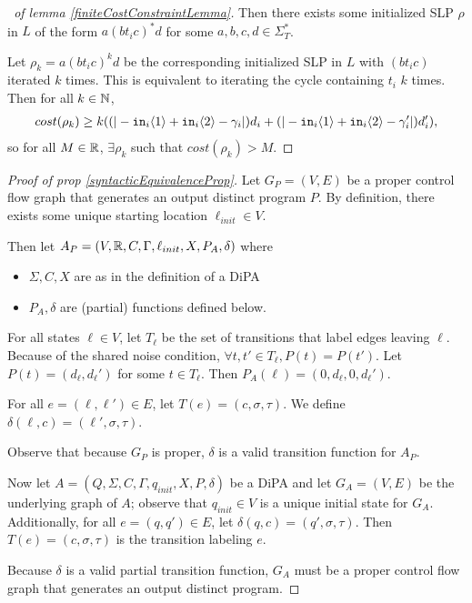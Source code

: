 \begin{proof}[\proofname~of lemma \ref{finiteCostConstraintLemma}]
    Then there exists some initialized SLP $\rho$ in $L$ of the form $a(bt_ic)^*d$ for some $a, b, c, d\in \Sigma_T^*$.
    
    Let $\rho_k=a(bt_ic)^kd$ be the corresponding initialized SLP in $L$ with $(bt_ic)$ iterated $k$ times. This is equivalent to iterating the cycle containing $t_i$ $k$ times. Then for all $k\in \mathbb{N}$, \begin{align*}
        cost(\rho_k) \geq k((|-\texttt{in}_i\langle1 \rangle+\texttt{in}_i\langle2 \rangle-\gamma_i|)d_i+(|-\texttt{in}_i\langle1 \rangle+\texttt{in}_i\langle2 \rangle-\gamma_i'|)d_i'),
    \end{align*}
    so for all $M\in \mathbb{R}$, $\exists \rho_k$ such that $cost(\rho_k) > M$.
\end{proof}




\begin{proof}[Proof of prop \ref{syntacticEquivalenceProp}]
    Let $G_P = (V, E)$ be a proper control flow graph that generates an output distinct program $P$. By definition, there exists some unique starting location $\ell_{init} \in V$.

    Then let $A_P = (V, \mathbb{R}, C, \Gamma, \ell_{init}, X, P_A, \delta)$ where
    \begin{itemize}
        \item $\Sigma, C, X$ are as in the definition of a DiPA
        \item $P_A, \delta$ are (partial) functions defined below.
    \end{itemize}
    
    For all states $\ell\in V$, let $T_\ell$ be the set of transitions that label edges leaving $\ell$. Because of the shared noise condition, $\forall t, t'\in T_{\ell}, P(t) = P(t')$. Let $P(t) = (d_\ell, d_\ell')$ for some $t\in T_\ell$. Then $P_A(\ell) = (0, d_\ell, 0, d_{\ell}')$.

    For all $e = (\ell, \ell')\in E$, let $T(e) = (c, \sigma, \tau)$. We define $\delta(\ell, c) = (\ell', \sigma, \tau)$.

    Observe that because $G_P$ is proper, $\delta$ is a valid transition function for $A_P$. 

    Now let $A = (Q, \Sigma, C, \Gamma, q_{init}, X, P, \delta)$ be a DiPA and let $G_A = (V, E)$ be the underlying graph of $A$; observe that $q_{init}\in V$ is a unique initial state for $G_A$. Additionally, for all $e = (q, q')\in E$, let $\delta(q, c) = (q', \sigma, \tau)$. Then $T(e) = (c, \sigma, \tau)$ is the transition labeling $e$. 

    Because $\delta$ is a valid partial transition function, $G_A$ must be a proper control flow graph that generates an output distinct program. 
\end{proof}


